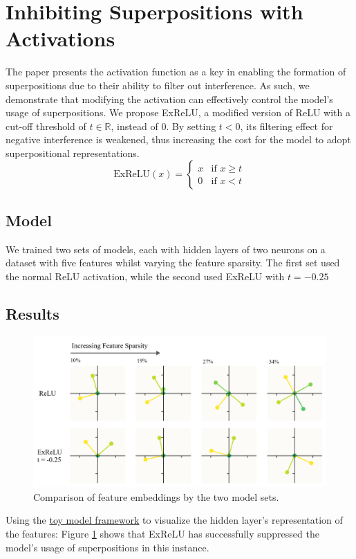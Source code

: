 \section{Inhibiting Superpositions with Activations}
\label{sec:act_fns}
The paper presents the activation function as a key in enabling the formation of superpositions due to their ability to 
filter out interference. As such, we demonstrate that modifying the activation can effectively control the model's usage of
superpositions. 
\newline
We propose ExReLU, a modified version of ReLU with a cut-off threshold of $t \in \mathbb{R}$, instead of $0$. By setting $t < 0$, its filtering effect for negative interference is weakened, thus
increasing the cost for the model to adopt superpositional representations.
\[
\text{ExReLU}(x) =
    \begin{cases}
        x & \text{if } x \geq t\\
        0 & \text{if } x < t
    \end{cases}
\] 

\subsection{Model}
We trained two sets of models, each with hidden layers of two neurons on a dataset with five features whilst varying the feature
sparsity. The first set used the normal ReLU activation, while the second used ExReLU with $t=-0.25$

\subsection{Results}
\begin{figure}[h]
	\centering
	\includegraphics[width=1\linewidth]{figures/acts_diagram.png}
	\caption{Comparison of feature embeddings by the two model sets.}
	\label{fig:acts_diagram}
\end{figure}
Using the \href{https://colab.research.google.com/github/anthropics/toy-models-of-superposition/blob/main/toy_models.ipynb}{toy model framework} to visualize the hidden layer's representation of the features:
Figure \ref{fig:acts_diagram} shows that ExReLU has successfully suppressed the model's usage of superpositions in this instance.

